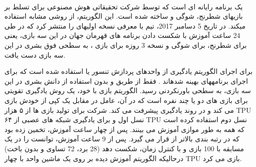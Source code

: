    
   

%
  
  

\paragraph{}
یک برنامه رایانه ای است که توسط شرکت تحقیقاتی هوش مصنوعی
 برای تسلط بر بازی\nf های شطرنج، شوگی و 
ساخته شده است. این الگوریتم، از روشی مشابه
  استفاده می\nf کند. در تاریخ 5 دسامبر 2017، تیم
  با معرفی
   نسخه اولیه\nf ای را منتشر کرد که در طی 24 ساعت آموزش با شکست دادن برنامه های قهرمان جهان در این سه بازی، یعنی
    برای شطرنج،
برای شوگی و نسخه 3 روزه
برای بازی 
،
به سطحی فوق بشری در این سه بازی دست یافت. 

برای اجرای الگوریتم یادگیری
از واحدهای پردازش تنسور 
یا 
استفاده شده است که برای اجرای برنامه\nf های
بهینه شده\nf اند
\cite{silver2017}.
  فقط از طریق 
و بدون استفاده از دانش بشری در این سه بازی، به سطحی باورنکردنی رسید. الگوریتم بازی با خود، یک روش یادگیری تقویتی برای بازی های دو یا چند نفره است که در آن، عامل در مقابل یک کپی از خودش بازی می کند و در روند یادگیری پیشرفت می کند. شرکت
  برای تولید  بازی ها از ۵ هزار TPU نسل اول و برای یادگیری شبکه های عصبی از ۶۴ TPU نسل دوم استفاده کرده است که همه به طور موازی آموزش می بینند.
پس از چهار ساعت آموزش،
  تخمین زده بود که
    در رتبه بندی
بالاتر از
  قرار می گیرد. پس از 9 ساعت آموزش، توانست
را در یک مسابقه با 100 بازی و با کنترل زمان، شکست دهد (28 برد، 72 تساوی و بدون باخت) 
\cite{silver2017} \cite{knapton2017entire} \cite{superhuman2017}
درحالی\nf که الگوریتم آموزش دیده بر روی یک ماشین واحد با چهار TPU بازی می کرد.

